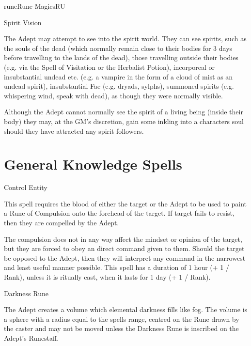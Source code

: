 \begin{College}[2.2]{rune}{Rune Magics}{RU}
\begin{talent}[T-2]{Spirit Vision}
\begin{effects}
The Adept may attempt to see into the spirit world. They can see
spirits, such as the souls of the dead (which normally remain close to
their bodies for 3 days before travelling to the lands of the dead),
those travelling outside their bodies (e.g. via the Spell of
Visitation or the Herbalist Potion), incorporeal or insubstantial
undead etc. (e.g. a vampire in the form of a cloud of mist as an
undead spirit), insubstantial Fae (e.g. dryads, sylphs), summoned
spirits (e.g. whispering wind, speak with dead), as though they were
normally visible.

Although the Adept cannot normally see the spirit of a living being
(inside their body) they may, at the GM’s discretion, gain some
inkling into a characters soul should they have attracted any spirit
followers.
\end{effects}
\end{talent}

\section{General Knowledge Spells}

\begin{spell}[G-1]{Control Entity}

\begin{effects}
This spell requires the blood of either the target or the Adept to be
used to paint a Rune of Compulsion onto the forehead of the target.
If target fails to resist, then they are compelled by the Adept.

The compulsion does not in any way affect the mindset or opinion of
the target, but they are forced to obey an direct command given to
them.  Should the target be opposed to the Adept, then they will
interpret any command in the narrowest and least useful manner
possible. This spell has a duration of 1 hour (+ 1 / Rank), unless it
is ritually cast, when it lasts for 1 day (+ 1 / Rank).
\end{effects}
\end{spell}

\begin{spell}[G-2]{Darkness Rune}

\begin{effects}
The Adept creates a volume which elemental darkness fills like fog.
The volume is a sphere with a radius equal to the spells range,
centred on the Rune drawn by the caster and may not be moved unless
the Darkness Rune is inscribed on the Adept’s Runestaff.


\end{effects}
\end{spell}
\end{College}
